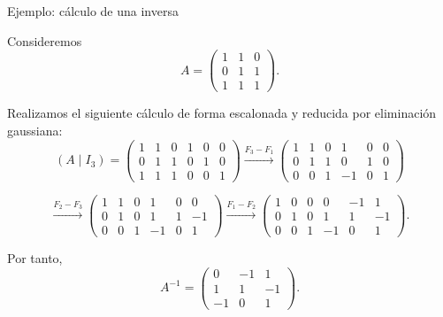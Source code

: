 \begin{frame}[allowframebreaks, t]{Ejemplo: cálculo de una inversa}

Consideremos
\[
A=
\begin{pmatrix}
1&1&0\\
0&1&1\\
1&1&1
\end{pmatrix}.
\]

Realizamos el siguiente cálculo de forma escalonada y reducida por eliminación gaussiana:
\[
(A\mid I_3)=
\left(
\begin{array}{ccc|ccc}
1&1&0&1&0&0\\
0&1&1&0&1&0\\
1&1&1&0&0&1
\end{array}
\right)
\xrightarrow{F_3-F_1}
\left(
\begin{array}{ccc|ccc}
1&1&0&1&0&0\\
0&1&1&0&1&0\\
0&0&1&-1&0&1
\end{array}
\right)
\]

\[
\xrightarrow{F_2-F_3}
\left(
\begin{array}{ccc|ccc}
1&1&0&1&0&0\\
0&1&0&1&1&-1\\
0&0&1&-1&0&1
\end{array}
\right)
\xrightarrow{F_1-F_2}
\left(
\begin{array}{ccc|ccc}
1&0&0&0&-1&1\\
0&1&0&1&1&-1\\
0&0&1&-1&0&1
\end{array}
\right).
\]

Por tanto,
\[
A^{-1}
=
\begin{pmatrix}
0&-1&1\\
1&1&-1\\
-1&0&1
\end{pmatrix}.
\]

\end{frame}